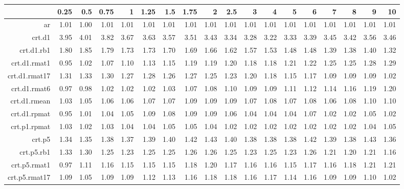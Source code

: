 \begin{tabular}{rrrrrrrrrrrrrrrrrr}
  \hline
 & 0.25 & 0.5 & 0.75 & 1 & 1.25 & 1.5 & 1.75 & 2 & 2.5 & 3 & 4 & 5 & 6 & 7 & 8 & 9 & 10 \\ 
  \hline
ar & 1.01 & 1.00 & 1.01 & 1.01 & 1.01 & 1.01 & 1.01 & 1.01 & 1.01 & 1.01 & 1.01 & 1.01 & 1.01 & 1.01 & 1.01 & 1.01 & 1.01 \\ 
  crt.d1 & 3.95 & 4.01 & 3.82 & 3.67 & 3.63 & 3.57 & 3.51 & 3.43 & 3.34 & 3.28 & 3.22 & 3.33 & 3.39 & 3.45 & 3.42 & 3.56 & 3.46 \\ 
  crt.d1.rb1 & 1.80 & 1.85 & 1.79 & 1.73 & 1.73 & 1.70 & 1.69 & 1.66 & 1.62 & 1.57 & 1.53 & 1.48 & 1.48 & 1.39 & 1.38 & 1.40 & 1.32 \\ 
  crt.d1.rmat1 & 0.95 & 1.02 & 1.07 & 1.10 & 1.13 & 1.15 & 1.19 & 1.19 & 1.20 & 1.18 & 1.18 & 1.21 & 1.22 & 1.25 & 1.25 & 1.28 & 1.29 \\ 
  crt.d1.rmat17 & 1.31 & 1.33 & 1.30 & 1.27 & 1.28 & 1.26 & 1.27 & 1.25 & 1.23 & 1.20 & 1.18 & 1.15 & 1.17 & 1.09 & 1.09 & 1.09 & 1.02 \\ 
  crt.d1.rmat6 & 0.97 & 0.98 & 1.02 & 1.02 & 1.02 & 1.03 & 1.07 & 1.08 & 1.10 & 1.09 & 1.09 & 1.11 & 1.12 & 1.14 & 1.16 & 1.19 & 1.20 \\ 
  crt.d1.rmean & 1.03 & 1.05 & 1.06 & 1.06 & 1.07 & 1.07 & 1.09 & 1.09 & 1.09 & 1.07 & 1.08 & 1.07 & 1.08 & 1.06 & 1.08 & 1.10 & 1.10 \\ 
  crt.d1.rpmat & 0.95 & 1.01 & 1.04 & 1.05 & 1.09 & 1.08 & 1.09 & 1.09 & 1.06 & 1.04 & 1.04 & 1.04 & 1.07 & 1.02 & 1.02 & 1.05 & 1.02 \\ 
  crt.p1.rpmat & 1.03 & 1.02 & 1.03 & 1.04 & 1.04 & 1.05 & 1.05 & 1.04 & 1.02 & 1.02 & 1.02 & 1.02 & 1.02 & 1.02 & 1.02 & 1.04 & 1.05 \\ 
  crt.p5 & 1.34 & 1.35 & 1.38 & 1.37 & 1.39 & 1.40 & 1.42 & 1.43 & 1.40 & 1.38 & 1.38 & 1.38 & 1.42 & 1.39 & 1.38 & 1.43 & 1.36 \\ 
  crt.p5.rb1 & 1.33 & 1.30 & 1.25 & 1.23 & 1.25 & 1.25 & 1.26 & 1.26 & 1.25 & 1.23 & 1.25 & 1.23 & 1.26 & 1.21 & 1.20 & 1.21 & 1.16 \\ 
  crt.p5.rmat1 & 0.97 & 1.11 & 1.16 & 1.15 & 1.15 & 1.15 & 1.18 & 1.20 & 1.17 & 1.16 & 1.16 & 1.15 & 1.17 & 1.16 & 1.18 & 1.21 & 1.21 \\ 
  crt.p5.rmat17 & 1.09 & 1.05 & 1.09 & 1.09 & 1.12 & 1.13 & 1.16 & 1.18 & 1.18 & 1.16 & 1.17 & 1.14 & 1.16 & 1.09 & 1.09 & 1.10 & 1.02 \\ 

\end{tabular}

